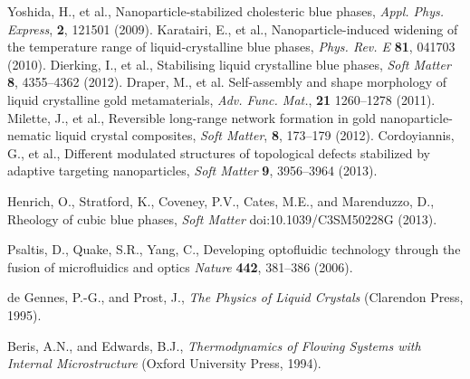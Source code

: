 \documentclass[12pt]{article}
\begin{document}
\begin{thebibliography}{99}
Yoshida, H., et al.,
Nanoparticle-stabilized cholesteric blue phases,
\textit{Appl. Phys. Express}, \textbf{2}, 121501 (2009).
%
 Karatairi, E., et al.,
Nanoparticle-induced widening of the temperature range of
liquid-crystalline blue phases, 
\textit{Phys. Rev. E} \textbf{81}, 041703 (2010).
%
%
Dierking, I., et al.,
Stabilising liquid crystalline blue phases,
\textit{Soft Matter} \textbf{8}, 4355--4362 (2012).
%
Draper, M., et al.
Self-assembly and shape morphology of liquid crystalline gold metamaterials,
\textit{Adv. Func. Mat.}, \textbf{21} 1260--1278 (2011).
%
Milette, J., et al.,
Reversible long-range network formation in gold nanoparticle-nematic
liquid crystal composites,
\textit{Soft Matter}, \textbf{8}, 173--179 (2012).
%
 Cordoyiannis, G., et al.,
Different modulated structures of topological defects stabilized by adaptive
targeting nanoparticles,
\textit{Soft Matter} \textbf{9}, 3956--3964 (2013).

Henrich, O., Stratford, K., Coveney, P.V., Cates, M.E., and Marenduzzo, D.,
Rheology of cubic blue phases,
{\it Soft Matter} doi:10.1039/C3SM50228G (2013).

 Psaltis, D., Quake, S.R., Yang, C.,
Developing optofluidic technology through the fusion of microfluidics and
optics {\it Nature} {\bf 442}, 381--386 (2006).


de Gennes, P.-G., and  Prost, J.,
{\it The Physics of Liquid Crystals} (Clarendon Press, 1995).

Beris, A.N., and  Edwards, B.J., 
{\it Thermodynamics of Flowing Systems with Internal Microstructure}
(Oxford University Press, 1994).


\end{thebibliography}
\end{document}
